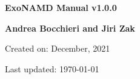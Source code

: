 

\begin{titlepage}

    \centering

    \vspace*{30mm} %
    \textbf{\Huge {ExoNAMD Manual v1.0.0}}


    \vspace{25mm}
    \Large \textbf{{Andrea Bocchieri and Jiri Zak}}

    \vspace*{8mm}
    \small Created on: December, 2021

    \vspace{2mm}
    \small Last updated: \MonthYearFormat\today


\end{titlepage}

\clearpage
{}
\tableofcontents
\listoffigures
\listoftables
\clearpage
{}